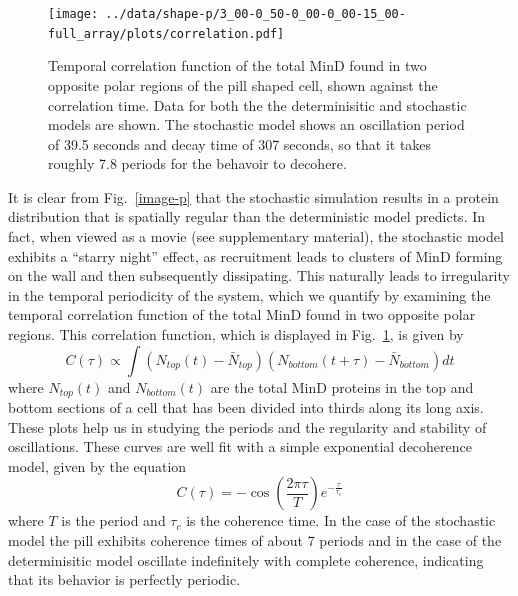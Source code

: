 \documentclass[letterpaper,twocolumn,amsmath,amssymb,pre]{revtex4-1}
\begin{document}
\begin{figure}
  \texttt{[image: ../data/shape-p/3\_00-0\_50-0\_00-0\_00-15\_00-full\_array/plots/correlation.pdf]}
  \caption{Temporal correlation function of the total MinD found in
    two opposite polar regions of the pill shaped cell, shown against
    the correlation time.  Data for both the the determinisitic and
    stochastic models are shown.  The stochastic model shows an
    oscillation period of 39.5 seconds and decay time of 307 seconds,
    so that it takes roughly 7.8 periods for the behavoir to
    decohere.}
  \label{corr-pill}
\end{figure}

It is clear from Fig.~\ref{image-p} that the stochastic simulation
results in a protein distribution that is spatially regular than the
deterministic model predicts.  In fact, when viewed as a movie (see
supplementary material), the stochastic model exhibits a ``starry
night'' effect, as recruitment leads to clusters of MinD forming on
the wall and then subsequently dissipating.  This naturally leads to
irregularity in the temporal periodicity of the system, which we
quantify by examining the temporal correlation function of the total
MinD found in two opposite polar regions.
%
This correlation function, which is displayed in Fig.~\ref{corr-pill},
is given by
\begin{equation}
  C(\tau) \propto \int
  (N_{\textit{top}}(t) - \bar N_{\textit{top}})
  (N_{\textit{bottom}}(t+\tau) - \bar N_{\textit{bottom}})dt
\end{equation}
where $N_{\textit{top}}(t)$ and $N_{\textit{bottom}}(t)$ are the total
MinD proteins in the top and bottom sections of a cell that has been
divided into thirds along its long axis.  These plots help us in
studying the periods and the regularity and stability of oscillations.
These curves are well fit with a simple exponential decoherence model,
given by the equation
\begin{equation}
  C(\tau) = -\cos\left(\frac{2\pi\tau}{T}\right) e^{-\frac{\tau}{\tau_c}}
\end{equation}
where $T$ is the period and $\tau_c$ is the coherence time.  In the
case of the stochastic model the pill exhibits coherence times of
about 7 periods and in the case of the determinisitic model oscillate
indefinitely with complete coherence, indicating that its behavior is
perfectly periodic.
\end{document}
